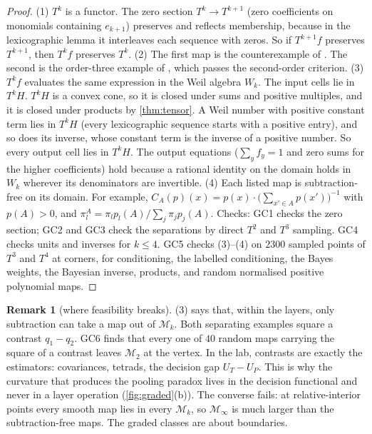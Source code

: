 \documentclass[11pt]{article}
\theoremstyle{definition}\newtheorem{definition}[theorem]{Definition}\newtheorem{remark}[theorem]{Remark}\newtheorem{example}[theorem]{Example}
\begin{document}
\begin{proof}
(1) $T^k$ is a functor. The zero section $T^k\to T^{k+1}$ (zero coefficients on monomials containing $e_{k+1}$) preserves and reflects
membership, because in the lexicographic lemma it interleaves each sequence with zeros. So if $T^{k+1}f$ preserves $T^{k+1}$, then $T^kf$
preserves $T^k$.
(2) The first map is the counterexample of \cite[Proposition ``morphisms'']{TangentCompanion}. The second is the order-three example of
\cite[Proposition ``order $k$: necessity, and order three'']{TangentCompanion}, which passes the second-order criterion.
(3) $T^kf$ evaluates the same expression in the Weil algebra $W_k$. The input cells lie in $T^kH$. $T^kH$ is a convex cone, so it is closed under
sums and positive multiples, and it is closed under products by \cref{thm:tensor}. A Weil number with positive constant term lies in $T^kH$
(every lexicographic sequence starts with a positive entry), and so does its inverse, whose constant term is the inverse of a positive
number. So every output cell lies in $T^kH$. The output equations ($\sum_y f_y=1$ and zero sums for the higher coefficients) hold because a
rational identity on the domain holds in $W_k$ wherever its denominators are invertible.
(4) Each listed map is subtraction-free on its domain. For example, $C_A(p)(x)=p(x)\cdot\bigl(\sum_{x'\in A}p(x')\bigr)^{-1}$ with $p(A)>0$, and
$\pi^A_l=\pi_lp_l(A)/\sum_j\pi_jp_j(A)$.
Checks: GC1 checks the zero section; GC2 and GC3 check the separations by direct $T^2$ and $T^3$ sampling. GC4 checks units and inverses
for $k\le4$. GC5 checks (3)--(4) on $2300$ sampled points of $T^3$ and $T^4$ at corners, for conditioning, the labelled conditioning, the
Bayes weights, the Bayesian inverse, products, and random normalised positive polynomial maps.
\end{proof}

\begin{remark}[where feasibility breaks]
(3) says that, within the layers, only subtraction can take a map out of $\mathcal M_k$. Both separating examples square a
contrast $q_1-q_2$. GC6 finds that every one of $40$ random maps carrying the square of a contrast leaves $\mathcal M_2$ at the vertex. In the lab,
contrasts are exactly the estimators: covariances, tetrads, the decision gap $U_T-U_P$. This is why the curvature that produces the
pooling paradox \cite[Proposition ``pooling paradox = curvature'']{TangentCompanion} lives in the decision functional and never in a layer
operation (\cref{fig:graded}(b)). The converse fails: at relative-interior points every smooth map lies in every $\mathcal M_k$, so $\mathcal M_\infty$ is
much larger than the subtraction-free maps. The graded classes are about boundaries.
\end{remark}
\end{document}
